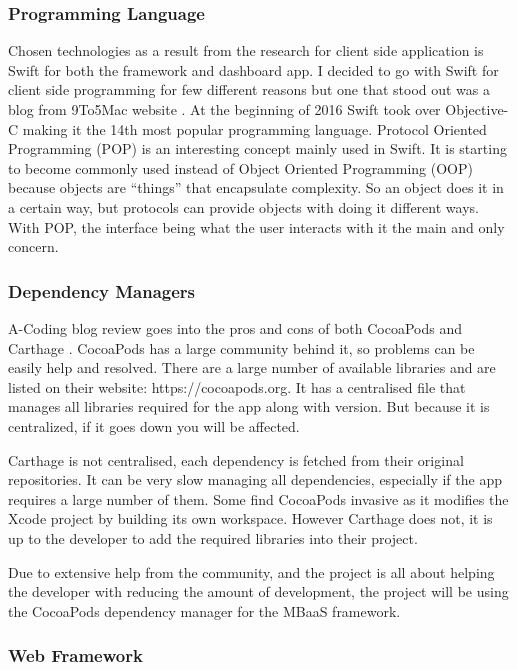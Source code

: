 \subsubsection{Programming Language}

Chosen technologies as a result from the research for client side application is Swift for both the framework and dashboard app. I decided to go with Swift for client side programming for few different reasons but one that stood out was a blog from 9To5Mac website \cite{webserver}. At the beginning of 2016 Swift took over Objective-C making it the 14th most popular programming language. Protocol Oriented Programming (POP) is an interesting concept mainly used in Swift. It is starting to become commonly used instead of Object Oriented Programming (OOP) because objects are “things” that encapsulate complexity. So an object does it in a certain way, but protocols can provide objects with doing it different ways. With POP, the interface being what the user interacts with it the main and only concern.

\subsubsection{Dependency Managers}

A-Coding blog review goes into the pros and cons of both CocoaPods and Carthage \cite{acodingwebsite}. CocoaPods has a large community behind it, so problems can be easily help and resolved. There are a large number of available libraries and are listed on their website: https://cocoapods.org. It has a centralised file that manages all libraries required for the app along with version. But because it is centralized, if it goes down you will be affected.

Carthage is not centralised, each dependency is fetched from their original repositories. It can be very slow managing all dependencies, especially if the app requires a large number of them. Some find CocoaPods invasive as it modifies the Xcode project by building its own workspace. However Carthage does not, it is up to the developer to add the required libraries into their project.

Due to extensive help from the community, and the project is all about helping the developer with reducing the amount of development, the project will be using the CocoaPods dependency manager for the MBaaS framework.


\subsubsection{Web Framework}

